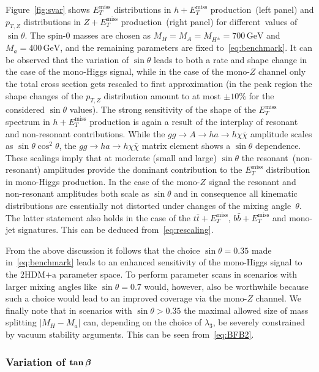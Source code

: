 \documentclass[review]{elsarticle}
\newcommand{\MET}{\ensuremath{E_T^\mathrm{miss}}\xspace}
\newcommand{\mA}{\ensuremath{M_{A}}\xspace}
\newcommand{\ma}{\ensuremath{M_{a}}\xspace}
\newcommand{\mH}{\ensuremath{M_{H}}\xspace}
\newcommand{\mHc}{\ensuremath{M_{H^{\pm}}}\xspace}
\newcommand{\hdma}{\ensuremath{\textrm{2HDM+a}}\xspace}
\def\bm#1{\mbox{\boldmath$#1$\unboldmath}}
\begin{document}
Figure~\ref{fig:svar} shows $\MET$ distributions in $h + \MET$ production~(left panel) and $p_{T,Z}$ distributions in $Z+\MET$ production~(right panel) for different~values of $\sin \theta$. The spin-0 masses are chosen as $\mH = \mA = \mHc = 700 \, {\mathrm{GeV}}$ and $\ma = 400 \, {\mathrm{GeV}}$, and the remaining parameters are fixed to~\eqref{eq:benchmark}. It can be observed that the variation of $\sin \theta$ leads to both a rate and shape change in the case of the mono-Higgs signal, while in the case of the mono-$Z$ channel only the total cross section gets rescaled to first approximation (in the peak region the shape changes of the $p_{T,Z}$ distribution amount to at most $\pm 10\%$ for the considered $\sin \theta$ values). The strong sensitivity of the shape of the $\MET$ spectrum in $h + \MET$ production is again a result of the interplay of resonant and non-resonant contributions. While the $gg \to A \to h a \to h \chi \bar \chi$  amplitude scales as $\sin \theta \cos^2 \theta$, the $gg \to h a  \to h \chi \bar \chi$ matrix element shows a $\sin \theta$ dependence. These scalings imply that at moderate  (small and large) $\sin \theta$ the resonant~(non-resonant) amplitudes provide the dominant contribution to the $\MET$ distribution in mono-Higgs production.  In the case of the mono-$Z$ signal the resonant and non-resonant amplitudes both scale as $\sin \theta$ and in consequence  all kinematic distributions are essentially not distorted  under changes of the mixing angle~$\theta$. The latter statement also holds in the case of the $t \bar t +\MET$, $b \bar b + \MET$ and mono-jet signatures.  This can be deduced from~\eqref{eq:rescaling}.

From the above discussion it follows that the choice $\sin \theta = 0.35$ made in~\eqref{eq:benchmark} leads to an enhanced sensitivity of the mono-Higgs signal to the \hdma parameter space. To perform parameter scans in scenarios with larger mixing angles like $\sin \theta = 0.7$ would, however, also be worthwhile because such a choice would lead to an improved coverage via the mono-$Z$ channel. We finally note that in scenarios with $\sin \theta >0.35$ the maximal allowed size of mass splitting $|M_H - M_a|$ can, depending on the choice of $\lambda_3$, be severely constrained by vacuum stability arguments. This can be seen from~\eqref{eq:BFB2}. 

\subsubsection[Variation of $\tan \beta$]{Variation of $\bm{\tan \beta}$}
\label{sec:variationtanb}
\end{document}
